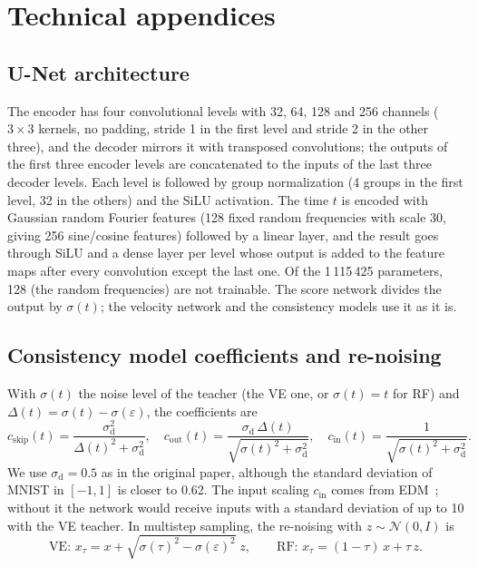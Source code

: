 \documentclass{article}
\begin{document}
\clearpage
{\small


}

\clearpage
\appendix
\raggedbottom
\section{Technical appendices}
\label{sec:appendix}

\subsection{U-Net architecture}
\label{sec:app_unet}

The encoder has four convolutional levels with 32, 64, 128 and 256 channels
($3\times3$ kernels, no padding, stride 1 in the first level and stride 2 in
the other three), and the decoder mirrors it with transposed convolutions;
the outputs of the first three encoder levels are concatenated to the inputs
of the last three decoder levels. Each level is followed by group
normalization (4 groups in the first level, 32 in the others) and the SiLU
activation. The time $t$ is encoded with Gaussian random Fourier features
(128 fixed random frequencies with scale 30, giving 256 sine/cosine features)
followed by a linear layer, and the result goes through SiLU and a dense layer
per level whose output is added to the feature maps after every convolution
except the last one. Of the 1\,115\,425 parameters, 128 (the random
frequencies) are not trainable. The score network divides the output by
$\sigma(t)$; the velocity network and the consistency models use it as it is.

\subsection{Consistency model coefficients and re-noising}
\label{sec:app_coef}

With $\sigma(t)$ the noise level of the teacher (the VE one, or $\sigma(t) = t$ for
RF) and $\Delta(t) = \sigma(t) - \sigma(\varepsilon)$, the coefficients are
\begin{equation}
  c_\text{skip}(t) = \frac{\sigma_\text{d}^2}{\Delta(t)^2 + \sigma_\text{d}^2}, \quad
  c_\text{out}(t) = \frac{\sigma_\text{d}\,\Delta(t)}{\sqrt{\sigma(t)^2 + \sigma_\text{d}^2}}, \quad
  c_\text{in}(t) = \frac{1}{\sqrt{\sigma(t)^2 + \sigma_\text{d}^2}}.
\end{equation}
We use $\sigma_\text{d} = 0.5$ as in the original paper, although the standard
deviation of MNIST in $[-1, 1]$ is closer to 0.62. The input scaling $c_\text{in}$
comes from EDM~\cite{karras2022edm}; without it the network would receive inputs
with a standard deviation of up to 10 with the VE teacher. In multistep sampling,
the re-noising with $z \sim \mathcal{N}(0, I)$ is
\begin{equation}
  \text{VE: } x_\tau = x + \sqrt{\sigma(\tau)^2 - \sigma(\varepsilon)^2}\; z,
  \qquad
  \text{RF: } x_\tau = (1 - \tau)\, x + \tau\, z.
\end{equation}
\end{document}
